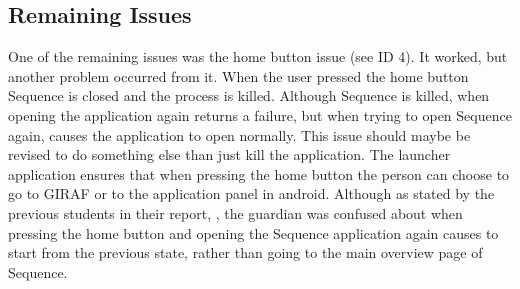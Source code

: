\subsection{Remaining Issues}
\label{subsec:spr1_remainissues}
One of the remaining issues was the home button issue (see ID 4). It worked, but another problem occurred from it. 
When the user pressed the home button Sequence is closed and the process is killed. Although Sequence is killed, when opening the application again returns a failure, but when trying to open Sequence again, causes the application to open normally.
This issue should maybe be revised to do something else than just kill the application.
The launcher application ensures that when pressing the home button the person can choose to go to GIRAF or to the application panel in android.
Although as stated by the previous students in their report, \citep{Zebra}, the guardian was confused about when pressing the home button and opening the Sequence application again causes to start from the previous state, rather than going to the main overview page of Sequence.